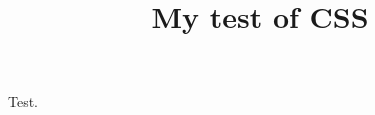 \documentclass{ximera}
\title{My test of CSS}
\begin{document}
\begin{abstract}
  
\end{abstract}
\maketitle

\begin{theorem}
  Test.
\end{theorem}
\end{document}
